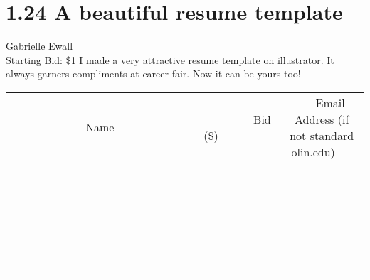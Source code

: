 \documentclass[11pt]{article}
\begin{document}
\section*{1.24 A beautiful resume template }
Gabrielle Ewall
\\
Starting Bid: \$1
\newline
I made a very attractive resume template on illustrator. It always garners compliments at career fair. Now it can be yours too!
\\[6ex]
\begin{tabular}{c c c}
~~~~~~~~~~~~~Name~~~~~~~~~~~~~ & ~~~~~~~~~Bid (\$)~~~~~~~~~  & ~~~Email Address (if not standard olin.edu)~~~\\
 & & \\
\hline
 & & \\
\hline
 & & \\
\hline
 & & \\
\hline
 & & \\
\hline
 & & \\
\hline
 & & \\
\hline
 & & \\
\hline
 & & \\
\hline
 & & \\
\hline
 & & \\
\hline
 & & \\
\hline
 & & \\
\hline
 & & \\
\hline
 & & \\
\hline
 & & \\
\hline
 & & \\
\hline
 & & \\
\hline
 & & \\
\hline
 & & \\
\hline
 & & \\
\hline
 & & \\
\hline
 & & \\
\hline
 & & \\
\hline
 & & \\
\hline
 & & \\
\hline
\end{tabular}
\newpage
\end{document}
